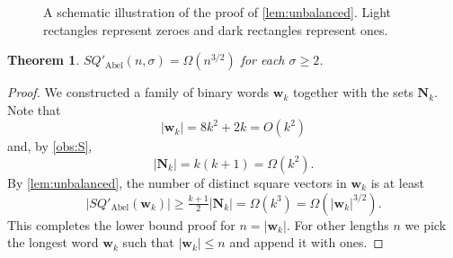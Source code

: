 \documentclass{article}
\theoremstyle{plain}
\newtheorem{theorem}{Theorem}[section]
\theoremstyle{definition}
\theoremstyle{remark}
\newcommand{\ww}{\mathbf{w}}
\newcommand{\NN}{\mathbf{N}}
\newcommand{\SQ}{\mathit{SQ}}
\newcommand{\SQPABEL}{\SQ'_{\mathrm{Abel}}}
\begin{document}
  \begin{figure}[t]
    \centering
    \def\blockH{0.6}
\newcommand{\drawBlock}[4]{
  \draw[fill=white] (#1,0)--(#1/2+#2/2,0)--(#1/2+#2/2,\blockH)--(#1,\blockH)--cycle;
  \draw[fill=white!70!black] (#1/2+#2/2,0)--(#2,0)--(#2,\blockH)--(#1/2+#2/2,\blockH)--cycle;
  \node at (#1+#2/4-#1/4,\blockH) [above] {\small #3};
  \node at (#1/2+#2/2+#2/4-#1/4,\blockH) [above] {\small #4};
}
     \caption{\label{fig:unbalanced}
      A schematic illustration of the proof of \cref{lem:unbalanced}.
      Light rectangles represent zeroes and dark rectangles represent ones.
    }
  \end{figure}

  \begin{theorem}
    $\SQPABEL(n,\sigma)= \Omega(n^{3/2})$ for each $\sigma \ge 2$.
  \end{theorem}
  \begin{proof}
    We constructed a family of binary words $\ww_k$ together with the sets $\NN_k$.
    Note that 
    \[|\ww_k| = 8k^2+2k=O(k^2)\]
    and, by \cref{obs:S},
    \[|\NN_k|=k(k+1)=\Omega(k^2).\]
    By \cref{lem:unbalanced}, the number of distinct square vectors in $\ww_k$ is at least
    \[|\SQPABEL(\ww_k)|\ge \tfrac{k+1}{2}|\NN_k| = \Omega(k^3)=\Omega(|\ww_k|^{3/2}).\]
    This completes the lower bound proof for $n=|\ww_k|$.
    For other lengths $n$ we pick the longest word $\ww_k$ such that $|\ww_k| \le n$
    and append it with ones.
  \end{proof}
\end{document}
